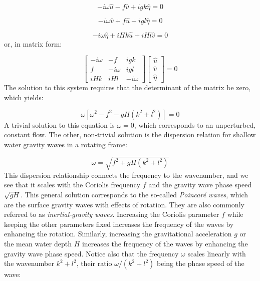 \documentclass[12pt]{article}
\numberwithin{equation}{section}
\numberwithin{figure}{section}
\numberwithin{table}{section}
\begin{document}
\begin{equation}
  - i \omega \widehat{u} - f \widehat{v} + i g k \widehat{\eta} = 0
\end{equation}

\begin{equation}
  - i \omega \widehat{v} + f \widehat{u} + i g l \widehat{\eta} = 0
\end{equation}

\begin{equation}
  - i \omega \widehat{\eta} + i H k \widehat{u} + i H l \widehat{v} = 0
\end{equation}
or, in matrix form:

\begin{equation}
  \begin{bmatrix}
    - i \omega & - f        & i g k \\
    f          & - i \omega & i g l \\
    i H k      & i H l      & - i \omega
  \end{bmatrix}
  \begin{bmatrix}
    \widehat{u} \\
    \widehat{v} \\
    \widehat{\eta}
  \end{bmatrix} = 0
\end{equation}
The solution to this system requires that the determinant of the matrix be zero,
which yields:

\begin{equation}
  \omega[\omega^2 - f^2 - gH(k^2 + l^2)] = 0
  \label{eq:swe_determinant}
\end{equation}
A trivial solution to this equation is $\omega = 0$, which corresponds to an
unperturbed, constant flow.
The other, non-trivial solution is the dispersion relation for shallow water
gravity waves in a rotating frame:

\begin{equation}
  \omega = \sqrt{f^2 + gH(k^2 + l^2)}
  \label{eq:swe_dispersion}
\end{equation}
This dispersion relationship connects the frequency to the wavenumber, and we
see that it scales with the Coriolis frequency $f$ and the gravity wave
phase speed $\sqrt{gH}$.
This general solution corresponds to the so-called
\textit{Poincaré waves}, which are the surface gravity
waves with effects of rotation.
They are also commonly referred to as
\textit{inertial-gravity waves}.
Increasing the Coriolis parameter $f$ while keeping the other parameters fixed
increases the frequency of the waves by enhancing the rotation.
Similarly, increasing the gravitational acceleration $g$ or the mean water depth
$H$ increases the frequency of the waves by enhancing the gravity wave phase
speed.
Notice also that the frequency $\omega$ scales linearly with the wavenumber
$k^2 + l^2$, their ratio $\omega / (k^2 + l^2)$ being the phase speed of the
wave:
\end{document}
